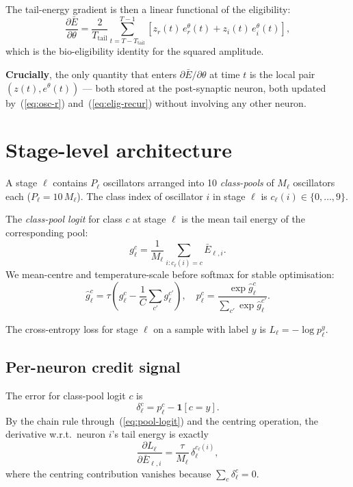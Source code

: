 \documentclass[11pt]{article}
\newcommand{\zr}{z_r}
\newcommand{\zi}{z_i}
\begin{document}
The tail-energy gradient is then a linear functional of the eligibility:
\begin{equation}
\frac{\partial \bar E}{\partial \theta}
= \frac{2}{T_{\mathrm{tail}}}
  \sum_{t = T - T_{\mathrm{tail}}}^{T-1}
  \left[ \zr(t)\,e^\theta_r(t) + \zi(t)\,e^\theta_i(t) \right],
\label{eq:dE-dtheta}
\end{equation}
which is the bio-eligibility identity for the squared amplitude.

\textbf{Crucially}, the only quantity that enters $\partial \bar E /
\partial \theta$ at time $t$ is the local pair $(z(t), e^\theta(t))$ ---
both stored at the post-synaptic neuron, both updated by~(\ref{eq:osc-r})
and~(\ref{eq:elig-recur}) without involving any other neuron.

\section{Stage-level architecture}

A stage $\ell$ contains $P_\ell$ oscillators arranged into 10
\emph{class-pools} of $M_\ell$ oscillators each
($P_\ell = 10\, M_\ell$). The class index of oscillator $i$ in stage
$\ell$ is $c_\ell(i) \in \{0, \ldots, 9\}$.

The \emph{class-pool logit} for class $c$ at stage $\ell$ is the mean
tail energy of the corresponding pool:
\begin{equation}
g_\ell^c = \frac{1}{M_\ell} \sum_{i : c_\ell(i) = c} \bar E_{\ell, i}.
\label{eq:pool-logit}
\end{equation}
We mean-centre and temperature-scale before softmax for stable
optimisation:
\begin{equation}
\hat g_\ell^c = \tau \left(g_\ell^c - \frac{1}{C}\sum_{c'} g_\ell^{c'}\right),
\quad p_\ell^c = \frac{\exp \hat g_\ell^c}{\sum_{c'} \exp \hat g_\ell^{c'}}.
\end{equation}

The cross-entropy loss for stage $\ell$ on a sample with label $y$ is
$L_\ell = -\log p_\ell^y$.

\subsection{Per-neuron credit signal}

The error for class-pool logit $c$ is
\begin{equation}
\delta_\ell^c = p_\ell^c - \mathbf{1}[c = y].
\end{equation}
By the chain rule through~(\ref{eq:pool-logit}) and the centring
operation, the derivative w.r.t.\ neuron $i$'s tail energy is exactly
\begin{equation}
\frac{\partial L_\ell}{\partial \bar E_{\ell, i}}
= \frac{\tau}{M_\ell} \, \delta_\ell^{c_\ell(i)},
\label{eq:dL-dE}
\end{equation}
where the centring contribution vanishes because $\sum_c \delta_\ell^c
= 0$.
\end{document}
